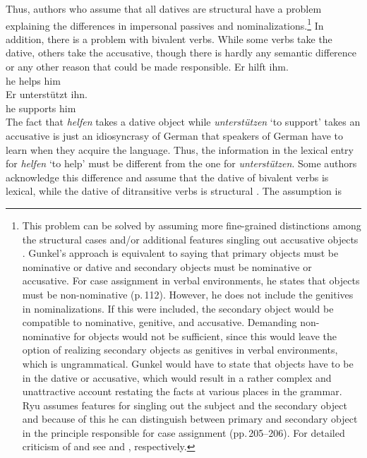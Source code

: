 \noindent
Thus, authors who assume that all datives are structural have a problem explaining the differences in
impersonal passives and nominalizations.\footnote{\label{fn-structural-dative}
  This problem can be solved by assuming more fine-grained distinctions among the structural cases
  \citep[]{Gunkel2003b} and/or additional features singling out accusative objects
  \citep[]{Ryu97a}. Gunkel's approach is equivalent to saying that primary objects must be nominative
  or dative and secondary objects must be nominative or accusative. For case assignment in verbal
  environments, he states that objects must be non-nominative (p.\,112). However, he does not include the
  genitives in nominalizations. If this were included, the secondary object would be compatible to
  nominative, genitive, and accusative. Demanding non-nominative for objects would not be
  sufficient, since this would leave the option of realizing secondary objects as genitives in
  verbal environments, which is ungrammatical. Gunkel would have to state that objects have to
  be in the dative or accusative, which would result in a rather complex and unattractive
  account restating the facts at various places in the grammar. Ryu assumes features for singling
  out the subject and the secondary object and because of this he can distinguish between primary
  and secondary object in the principle responsible for case assignment (pp.\,205--206). For
  detailed criticism of  and  see 
  and , respectively.  
} In addition, there is a problem with bivalent verbs. While
some verbs take the dative, others take the accusative, though there is hardly any semantic
difference or any other reason that could be made responsible.
\eal
\ex 
\gll Er hilft ihm.\\
     he helps him\\
\ex 
\gll Er unterstützt ihn.\\
     he supports him\\
\zl
The fact that \emph{helfen} takes a dative object while \emph{unterstützen} `to support' takes an accusative is
just an idiosyncrasy of German that speakers of German have to learn when they acquire the
language. Thus, the information in the lexical entry for \emph{helfen} `to help' must be different from the one
for \emph{unterstützen}. Some authors acknowledge this difference and assume that the dative of
bivalent verbs is lexical, while the dative of ditransitive verbs is structural \citep[, 51]{Wunderlich97a}. The assumption is

